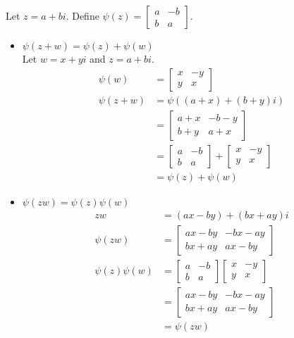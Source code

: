 \documentclass[12pt]{article}
\begin{document}
Let $z = a+bi$. Define $\psi(z) = \begin{bmatrix} a & -b \\ b & a \end{bmatrix} $. \begin{itemize} 
\item $\psi(z + w) = \psi(z) + \psi(w)$ \\ Let $w = x + yi$ and $z = a + bi$. $$ \begin{aligned} \psi(w) &= \begin{bmatrix} x & -y \\ y & x \end{bmatrix} \\ \psi(z + w) &= \psi( (a+x) + (b + y)i) \\ &= \begin{bmatrix} a + x & -b - y \\ b + y & a + x \end{bmatrix} \\ &= \begin{bmatrix} a & -b \\ b & a \end{bmatrix} + \begin{bmatrix} x & -y \\ y & x \end{bmatrix} \\ &= \psi(z) +\psi(w) \end{aligned} $$ 
\item $\psi(zw) = \psi(z)\psi(w)$ $$ \begin{aligned} zw &= (ax - by) + (bx + ay)i \\ \psi(zw) &= \begin{bmatrix} ax - by & -bx - ay \\ bx + ay & ax - by \end{bmatrix} \\ \psi(z)\psi(w) &= \begin{bmatrix} a & -b \\ b & a \end{bmatrix} \begin{bmatrix} x & -y \\ y & x \end{bmatrix} \\ &= \begin{bmatrix} ax - by & -bx - ay \\ bx + ay & ax - by \end{bmatrix} \\ &= \psi(zw) \end{aligned} $$ 

\end{itemize}
\end{document}
